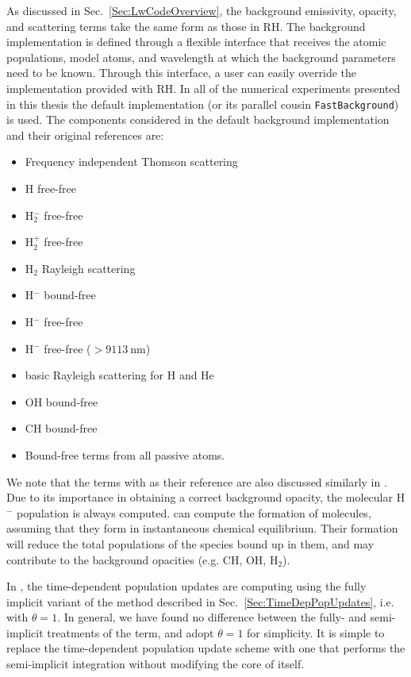 As discussed in Sec.~\ref{Sec:LwCodeOverview}, the background emissivity, opacity, and scattering terms take the same form as those in RH.
The background implementation is defined through a flexible interface that receives the atomic populations, model atoms, and wavelength at which the background parameters need to be known.
Through this interface, a user can easily override the implementation provided with RH.
In all of the numerical experiments presented in this thesis the default implementation (or its parallel cousin \texttt{FastBackground}) is used.
The components considered in the default background implementation and their original references are:
\begin{itemize}
    \itemsep-0.5em
    \item Frequency independent Thomson scattering \citep{Mihalas1978}
    \item H free-free \citep{Mihalas1978}
    \item H$_2^-$ free-free \citep{Bell1980}
    \item H$_2^+$ free-free \citep{Bates1952}
    \item H$_2$ Rayleigh scattering \citep{Victor1969,Tarafdar1973}
    \item H$^-$ bound-free \citep{Geltman1962,Mihalas1978}
    \item H$^-$ free-free \citep{Stilley1970,Mihalas1978}
    \item H$^-$ free-free ($>\SI{9113}{\nano\m}$) \citep{John1988}
    \item basic Rayleigh scattering for H and He \citep{Mihalas1978}
    \item OH bound-free \citep{Kurucz1987}
    \item CH bound-free \citep{Kurucz1987}
    \item Bound-free terms from all passive atoms.
\end{itemize}
We note that the terms with \citep{Mihalas1978} as their reference are also discussed similarly in \citep{Hubeny2014}.
Due to its importance in obtaining a correct background opacity, the molecular H$^-$ population is always computed.
\Lw{} can compute the formation of molecules, assuming that they form in instantaneous chemical equilibrium.
Their formation will reduce the total populations of the species bound up in them, and may contribute to the background opacities (e.g. CH, OH, H$_2$).

In \Lw{}, the time-dependent population updates are computing using the fully implicit variant of the method described in Sec.~\ref{Sec:TimeDepPopUpdates}, i.e. with $\theta=1$.
In general, we have found no difference between the fully- and semi-implicit treatments of the term, and adopt $\theta=1$ for simplicity.
It is simple to replace the time-dependent population update scheme with one that performs the semi-implicit integration without modifying the core of \Lw{} itself.

